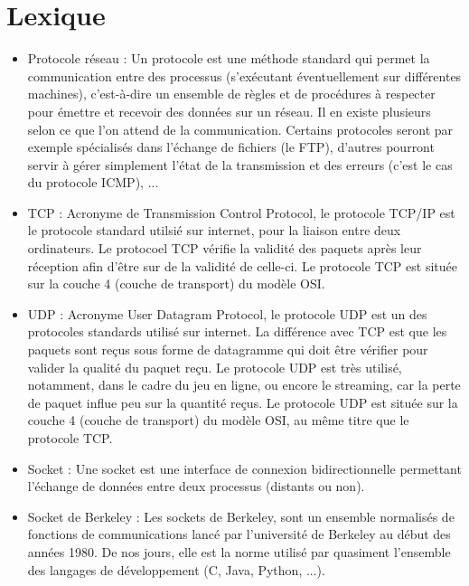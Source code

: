 \newpage
\appendix

\section{Lexique}
\begin{itemize}
\item Protocole réseau :
    Un protocole est une méthode standard qui permet la communication entre des processus (s'exécutant éventuellement sur différentes machines), 
    c'est-à-dire un ensemble de règles et de procédures à respecter pour émettre et recevoir des données sur un réseau. 
    Il en existe plusieurs selon ce que l'on attend de la communication. Certains protocoles seront par exemple spécialisés dans l'échange de fichiers (le FTP), 
    d'autres pourront servir à gérer simplement l'état de la transmission et des erreurs (c'est le cas du protocole ICMP), ... 
\newline

\item TCP : 
    Acronyme de Transmission Control Protocol, le protocole TCP/IP est le protocole standard utilsié sur internet, pour la liaison entre deux ordinateurs.
    Le protocoel TCP vérifie la validité des paquets après leur réception afin d'être sur de la validité de celle-ci. 
    Le protocole TCP est située sur la couche 4 (couche de transport) du modèle OSI. 
\newline

\item UDP :
    Acronyme User Datagram Protocol, le protocole UDP est un des protocoles standards utilisé sur internet. 
    La différence avec TCP est que les paquets sont reçus sous forme de datagramme qui doit être vérifier pour valider la qualité du paquet reçu.
    Le protocole UDP est très utilisé, notamment, dans le cadre du jeu en ligne, ou encore le streaming, car la perte de paquet influe peu sur la quantité reçus.
    Le protocole UDP est située sur la couche 4 (couche de transport) du modèle OSI, au même titre que le protocole TCP. 
   \newline
 
\item Socket :
    Une socket est une interface de connexion bidirectionnelle permettant l'échange de données entre deux processus (distants ou non).
   \newline
 
\item Socket de Berkeley :
    Les sockets de Berkeley, sont un ensemble normalisés de fonctions de communications lancé par l'université de Berkeley au début des années 1980.
    De nos jours, elle est la norme utilisé par quasiment l'ensemble des langages de développement (C, Java, Python, ...).
  \newline
  

\end{itemize}

